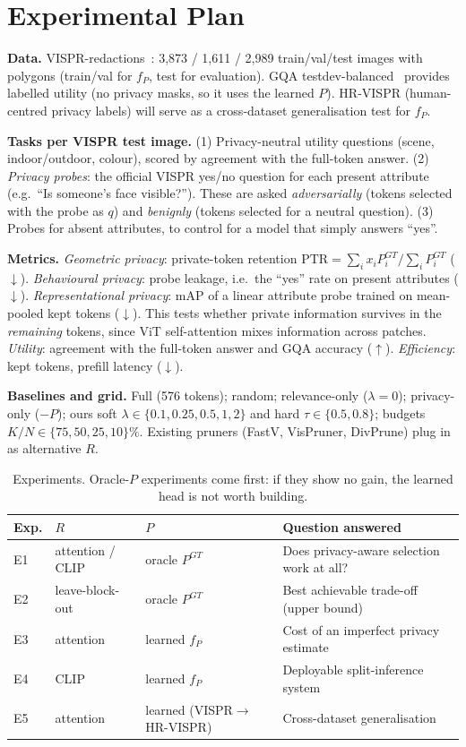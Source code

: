 \documentclass[10pt]{article}
\newcommand{\R}{R}
\renewcommand{\Pr}{P}
\begin{document}
\section{Experimental Plan}
\textbf{Data.} VISPR-redactions~\cite{orekondy2018redactions}: 3,873 / 1,611 / 2,989 train/val/test images with polygons (train/val for $f_P$, test for evaluation).
GQA testdev-balanced~\cite{hudson2019gqa} provides labelled utility (no privacy masks, so it uses the learned $\Pr$).
HR-VISPR (human-centred privacy labels) will serve as a cross-dataset generalisation test for $f_P$.

\textbf{Tasks per VISPR test image.} (1) Privacy-neutral utility questions (scene, indoor/outdoor, colour), scored by agreement with the full-token answer.
(2) \emph{Privacy probes}: the official VISPR yes/no question for each present attribute (e.g.\ ``Is someone's face visible?'').
These are asked \emph{adversarially} (tokens selected with the probe as $q$) and \emph{benignly} (tokens selected for a neutral question).
(3) Probes for absent attributes, to control for a model that simply answers ``yes''.

\textbf{Metrics.} \emph{Geometric privacy}: private-token retention $\mathrm{PTR}=\sum_i x_i\Pr^{GT}_i/\sum_i\Pr^{GT}_i$ ($\downarrow$).
\emph{Behavioural privacy}: probe leakage, i.e.\ the ``yes'' rate on present attributes ($\downarrow$).
\emph{Representational privacy}: mAP of a linear attribute probe trained on mean-pooled kept tokens ($\downarrow$). This tests whether private information
survives in the \emph{remaining} tokens, since ViT self-attention mixes information across patches.
\emph{Utility}: agreement with the full-token answer and GQA accuracy ($\uparrow$). \emph{Efficiency}: kept tokens, prefill latency ($\downarrow$).

\textbf{Baselines and grid.} Full (576 tokens); random; relevance-only ($\lambda{=}0$); privacy-only ($-\Pr$); ours soft
$\lambda\in\{0.1,0.25,0.5,1,2\}$ and hard $\tau\in\{0.5,0.8\}$; budgets $K/N\in\{75,50,25,10\}\%$.
Existing pruners (FastV, VisPruner, DivPrune) plug in as alternative $\R$.

\begin{table}[t]
\centering\small
\begin{tabular}{@{}llll@{}}
\toprule
Exp. & $\R$ & $\Pr$ & Question answered \\
\midrule
E1 & attention / CLIP & oracle $\Pr^{GT}$ & Does privacy-aware selection work at all? \\
E2 & leave-block-out & oracle $\Pr^{GT}$ & Best achievable trade-off (upper bound) \\
E3 & attention & learned $f_P$ & Cost of an imperfect privacy estimate \\
E4 & CLIP & learned $f_P$ & Deployable split-inference system \\
E5 & attention & learned (VISPR$\to$HR-VISPR) & Cross-dataset generalisation \\
\bottomrule
\end{tabular}
\caption{Experiments. Oracle-$\Pr$ experiments come first: if they show no gain, the learned head is not worth building.}
\label{tab:exp}
\vspace{-1em}
\end{table}
\end{document}
